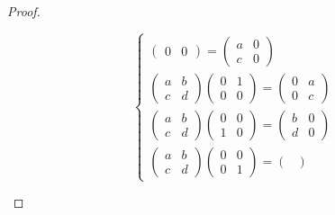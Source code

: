 \documentclass[class=linearalgebra,crop=false]{standalone}
\begin{document}
\begin{proof}
\begin{enumerate}[label = (\alph*)]
\[\begin{cases}
\begin{pmatrix}
                          0 & 0
                      \end{pmatrix}=
                      \begin{pmatrix}
                          a & 0 \\
                          c & 0
                      \end{pmatrix} \\
                      \begin{pmatrix}
                          a & b \\
                          c & d
                      \end{pmatrix}
                      \begin{pmatrix}
                          0 & 1 \\
                          0 & 0
                      \end{pmatrix}=
                      \begin{pmatrix}
                          0 & a \\
                          0 & c
                      \end{pmatrix} \\
                      \begin{pmatrix}
                          a & b \\
                          c & d
                      \end{pmatrix}
                      \begin{pmatrix}
                          0 & 0 \\
                          1 & 0
                      \end{pmatrix}=
                      \begin{pmatrix}
                          b & 0 \\
                          d & 0
                      \end{pmatrix} \\
                      \begin{pmatrix}
                          a & b \\
                          c & d
                      \end{pmatrix}
                      \begin{pmatrix}
                          0 & 0 \\
                          0 & 1
                      \end{pmatrix}=
                      \begin{pmatrix}

\end{pmatrix}
\end{cases}\]
\end{enumerate}
\end{proof}
\end{document}
